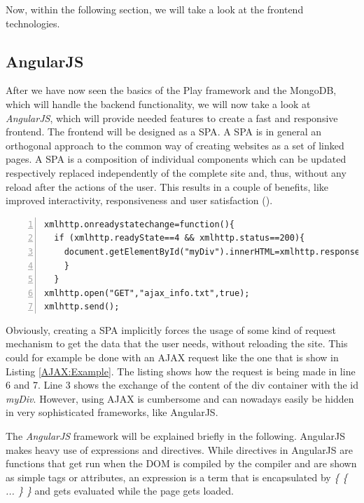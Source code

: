 Now, within the following section, we will take a look at the frontend technologies.
\subsection{AngularJS}
After we have now seen the basics of the Play framework and the MongoDB, which will handle the backend functionality, we will now take a look at \textit{AngularJS}, which will provide needed features to create a fast and responsive frontend. The frontend will be designed as a \ac{SPA}. A \ac{SPA} is in general an orthogonal approach to the common way of creating websites as a set of linked pages. A \ac{SPA} is a composition of individual components which can be updated respectively replaced independently of the complete site and, thus, without any reload after the actions of the user. This results in a couple of benefits, like improved interactivity, responsiveness and user satisfaction (\cite{Mes07}).

\begin{lstlisting}[numbers=left,caption={Simple example that shows the use of an AJAX request that shows the reponse text within a specific div container},label=AJAX:Example,frame=tlbr,breaklines]
xmlhttp.onreadystatechange=function(){
  if (xmlhttp.readyState==4 && xmlhttp.status==200){
    document.getElementById("myDiv").innerHTML=xmlhttp.responseText;
    }
  }
xmlhttp.open("GET","ajax_info.txt",true);
xmlhttp.send();
\end{lstlisting}

Obviously, creating a \ac{SPA} implicitly forces the usage of some kind of request mechanism to get the data that the user needs, without reloading the site. This could for example be done with an \ac{AJAX} request like the one that is show in Listing \ref{AJAX:Example}. The listing shows how the request is being made in line 6 and 7. Line 3 shows the exchange of the content of the div container with the id \textit{myDiv}. However, using \ac{AJAX} is cumbersome and can nowadays easily be hidden in very sophisticated frameworks, like AngularJS.

The \textit{AngularJS} framework will be explained briefly in the following. AngularJS makes heavy use of expressions and directives.
While directives in AngularJS are functions that get run when the DOM is compiled by the compiler and are shown as simple tags or attributes, an expression is a term that is encapsulated by \textit{\{ \{ ... \} \}} and gets evaluated while the page gets loaded.

